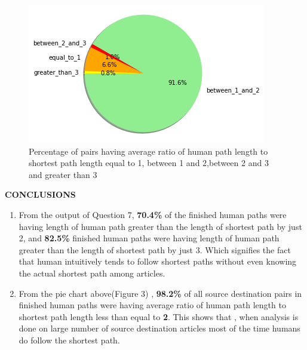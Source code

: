 \documentclass[12pt]{article}
\begin{document}
\begin{enumerate}
\begin{figure}[H]
\centering
\includegraphics[scale=0.7]{pie.png}
\caption{Percentage of pairs having average ratio of human path length to shortest path length equal to 1, between 1 and 2,between 2 and 3 and greater than 3}
\end{figure}



 \end{enumerate}
 
\textbf{CONCLUSIONS}
\begin{enumerate}
    \item From the output of Question 7, \textbf{70.4\%} of the finished human paths were having length of human path greater than  the length of shortest path by just 2, and \textbf{82.5\%} finished human paths were having length of human path greater than the length of shortest path by just 3. Which signifies the fact that human intuitively tends to follow shortest paths without even knowing the actual shortest path among articles.
    
    \item From the pie chart above(Figure 3) , \textbf{98.2\%} of all source destination pairs in finished human paths were having average ratio of human path length to shortest path length less than equal to \textbf{2}. This shows that , when analysis is done on large number of source destination articles most of the time humans do follow the shortest path. 
    
\end{enumerate}
\end{document}
